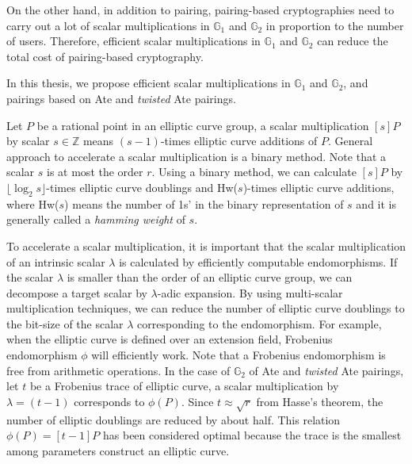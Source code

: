 On the other hand, in addition to pairing, pairing-based cryptographies need to carry out a lot of scalar multiplications in $\mathbb{G}_1$ and $\mathbb{G}_2$ in proportion to the number of users.
Therefore, efficient scalar multiplications in $\mathbb{G}_1$ and $\mathbb{G}_2$ can reduce the total cost of pairing-based cryptography.

In this thesis, we propose efficient scalar multiplications in $\mathbb{G}_1$ and $\mathbb{G}_2$, and pairings based on Ate and {\it twisted} Ate pairings.

Let $P$ be a rational point in an elliptic curve group, a scalar multiplication $[s]P$ by scalar $s\in{\mathbb Z}$ means $(s-1)$-times elliptic curve additions of $P$.
General approach to accelerate a scalar multiplication is a binary method.
Note that a scalar $s$ is at most the order $r$.
Using a binary method, we can calculate $[s]P$ by $\lfloor \log_2 s \rfloor$-times elliptic curve doublings and Hw($s$)-times elliptic curve additions, where Hw($s$) means the number of 1s' in the binary representation of $s$ and it is generally called a {\it hamming weight} of $s$.  

To accelerate a scalar multiplication, it is important that the scalar multiplication of an intrinsic scalar $\lambda$ is calculated by efficiently computable endomorphisms.
If the scalar $\lambda$ is smaller than the order of an elliptic curve group, we can decompose a target scalar by $\lambda$-adic expansion.
By using multi-scalar multiplication techniques, we can reduce the number of elliptic curve doublings to the bit-size of the scalar $\lambda$ corresponding to the endomorphism.
For example, when the elliptic curve is defined over an extension field, Frobenius endomorphism $\phi$ will efficiently work.
Note that a Frobenius endomorphism is free from arithmetic operations.
In the case of $\mathbb{G}_2$ of Ate and {\it twisted} Ate pairings, let $t$ be a Frobenius trace of elliptic curve, a scalar multiplication by $\lambda = (t-1)$ corresponds to $\phi(P)$.
Since $t\approx\sqrt{r}$ from Hasse's theorem, the number of elliptic doublings are reduced by about half.
This relation $\phi(P)=[t-1]P$ has been considered optimal because the trace is the smallest among parameters construct an elliptic curve. 

